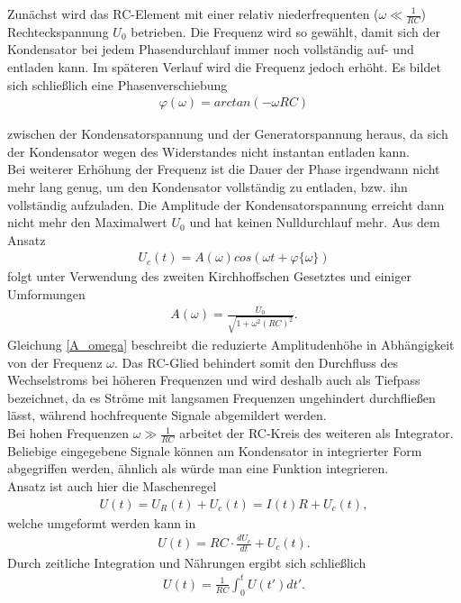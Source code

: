 Zunächst wird das RC-Element mit einer relativ niederfrequenten ($\omega\ll\frac{1}{RC}$) Rechteckspannung $U_0$ betrieben. Die Frequenz wird so gewählt, damit sich der Kondensator bei jedem Phasendurchlauf immer noch vollständig auf- und entladen kann.
Im späteren Verlauf wird die Frequenz jedoch erhöht. Es bildet sich schließlich eine Phasenverschiebung 
\begin{align}
\varphi(\omega)=arctan(-\omega RC)
\label{varphi}
\end{align}

zwischen der Kondensatorspannung und der Generatorspannung heraus, da sich der Kondensator wegen des Widerstandes nicht instantan entladen kann.\\

Bei weiterer Erhöhung der Frequenz ist die Dauer der Phase irgendwann nicht mehr lang genug, um den Kondensator vollständig zu entladen, bzw. ihn vollständig aufzuladen.
Die Amplitude der Kondensatorspannung erreicht dann nicht mehr den Maximalwert $U_0$ und hat keinen Nulldurchlauf mehr.
Aus dem Ansatz
\begin{align*}
U_c(t)=A(\omega)cos(\omega t+\varphi\{\omega\})
\end{align*}
folgt unter Verwendung des zweiten Kirchhoffschen Gesetztes und einiger Umformungen
\begin{align}
A(\omega)= \frac{U_0}{\sqrt{1+\omega^2(RC)^2}}
\label{A_omega} .
\end{align}
Gleichung \eqref{A_omega} beschreibt die reduzierte Amplitudenhöhe in Abhängigkeit von der Frequenz $\omega$.
Das RC-Glied behindert somit den Durchfluss des Wechselstroms bei höheren Frequenzen und wird deshalb auch als Tiefpass bezeichnet, da es Ströme mit langsamen Frequenzen ungehindert durchfließen lässt, während hochfrequente Signale abgemildert werden.\\

Bei hohen Frequenzen $\omega\gg\frac{1}{RC}$ arbeitet der RC-Kreis des weiteren als Integrator. Beliebige eingegebene Signale können am Kondensator in integrierter Form abgegriffen werden, ähnlich als würde man eine Funktion integrieren.\\
Ansatz ist auch hier die Maschenregel
\begin{align*}
U(t)=U_R(t)+U_c(t)=I(t)R+U_c(t),
\end{align*}
welche umgeformt werden kann in
\begin{align*}
U(t)=RC\cdot\frac{dU_c}{dt}+U_c(t).
\end{align*}
Durch zeitliche Integration und Nährungen ergibt sich schließlich
\begin{align}
U(t)=\frac{1}{RC} \int_0^t U(t')dt'.
\label{int}
\end{align}

